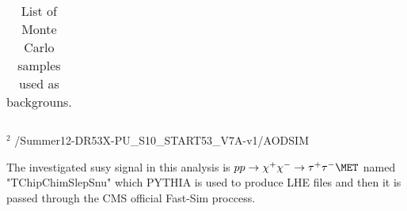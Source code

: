 \begin{table}[!ht]
\begin{center}
{\begin{tabular}{|l|l|c|}
\hline

\end{tabular}
}
\end{center}
$^{2}$ /Summer12-DR53X-PU\_S10\_START53\_V7A-v1/AODSIM\\

\caption{ 
  List of Monte Carlo samples used as backgrouns.
}
\label{Tab.MCSamples}

\end{table}

The investigated susy signal in this analysis is $pp \rightarrow \chi^+ \chi^- \rightarrow \tau^+ \tau^- \MET$ named "TChipChimSlepSnu" which PYTHIA is used to produce LHE files and then it is passed through the CMS official Fast-Sim proccess.
